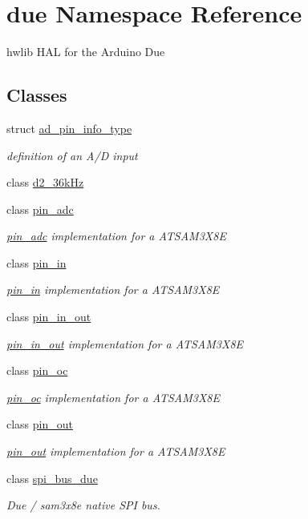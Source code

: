 \hypertarget{namespacedue}{}\section{due Namespace Reference}
\label{namespacedue}


hwlib H\+AL for the Arduino Due  


\subsection*{Classes}
\begin{DoxyCompactItemize}
\item 
struct \hyperlink{structdue_1_1ad__pin__info__type}{ad\+\_\+pin\+\_\+info\+\_\+type}
\begin{DoxyCompactList}\small\item\em definition of an A/D input \end{DoxyCompactList}\item 
class \hyperlink{classdue_1_1d2__36kHz}{d2\+\_\+36k\+Hz}
\item 
class \hyperlink{classdue_1_1pin__adc}{pin\+\_\+adc}
\begin{DoxyCompactList}\small\item\em \hyperlink{classdue_1_1pin__adc}{pin\+\_\+adc} implementation for a A\+T\+S\+A\+M3\+X8E \end{DoxyCompactList}\item 
class \hyperlink{classdue_1_1pin__in}{pin\+\_\+in}
\begin{DoxyCompactList}\small\item\em \hyperlink{classdue_1_1pin__in}{pin\+\_\+in} implementation for a A\+T\+S\+A\+M3\+X8E \end{DoxyCompactList}\item 
class \hyperlink{classdue_1_1pin__in__out}{pin\+\_\+in\+\_\+out}
\begin{DoxyCompactList}\small\item\em \hyperlink{classdue_1_1pin__in__out}{pin\+\_\+in\+\_\+out} implementation for a A\+T\+S\+A\+M3\+X8E \end{DoxyCompactList}\item 
class \hyperlink{classdue_1_1pin__oc}{pin\+\_\+oc}
\begin{DoxyCompactList}\small\item\em \hyperlink{classdue_1_1pin__oc}{pin\+\_\+oc} implementation for a A\+T\+S\+A\+M3\+X8E \end{DoxyCompactList}\item 
class \hyperlink{classdue_1_1pin__out}{pin\+\_\+out}
\begin{DoxyCompactList}\small\item\em \hyperlink{classdue_1_1pin__out}{pin\+\_\+out} implementation for a A\+T\+S\+A\+M3\+X8E \end{DoxyCompactList}\item 
class \hyperlink{classdue_1_1spi__bus__due}{spi\+\_\+bus\+\_\+due}
\begin{DoxyCompactList}\small\item\em Due / sam3x8e native S\+PI bus. \end{DoxyCompactList}\end{DoxyCompactItemize}
